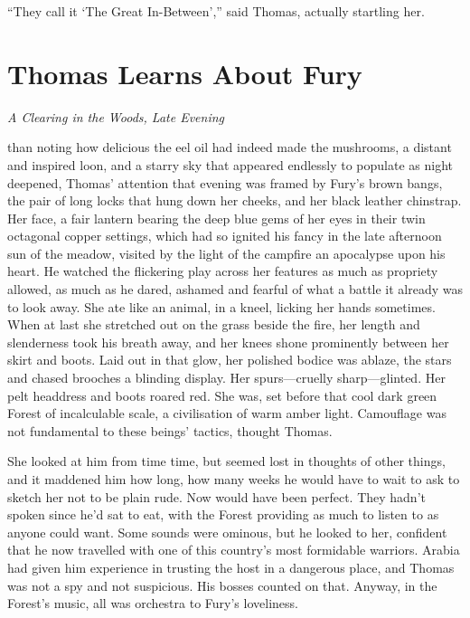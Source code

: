 \documentclass[11pt,a5paper]{article}
\newcommand{\alet}[1]{\textit{#1}\vspace{1em}}
\begin{document}
``They call it `The Great In-Between','' said Thomas, actually startling her.

\newpage

\section{Thomas Learns About Fury}

\alet{A Clearing in the Woods, Late Evening}

 than noting how delicious the eel oil had indeed made the mushrooms, a distant and inspired loon, and a starry sky that appeared endlessly to populate as night deepened, Thomas' attention that evening was framed by Fury's brown bangs, the pair of long locks that hung down her cheeks, and her black leather chinstrap. Her face, a fair lantern bearing the deep blue gems of her eyes in their twin octagonal copper settings, which had so ignited his fancy in the late afternoon sun of the meadow, visited by the light of the campfire an apocalypse upon his heart. He watched the flickering play across her features as much as propriety allowed, as much as he dared, ashamed and fearful of what a battle it already was to look away. She ate like an animal, in a kneel, licking her hands sometimes. When at last she stretched out on the grass beside the fire, her length and slenderness took his breath away, and her knees shone prominently between her skirt and boots. Laid out in that glow, her polished bodice was ablaze, the stars and chased brooches a blinding display. Her spurs---cruelly sharp---glinted. Her pelt headdress and boots roared red. She was, set before that cool dark green Forest of incalculable scale, a civilisation of warm amber light. Camouflage was not fundamental to these beings' tactics, thought Thomas.

She looked at him from time time, but seemed lost in thoughts of other things, and it maddened him how long, how many weeks he would have to wait to ask to sketch her not to be plain rude. Now would have been perfect. They hadn't spoken since he'd sat to eat, with the Forest providing as much to listen to as anyone could want. Some sounds were ominous, but he looked to her, confident that he now travelled with one of this country's most formidable warriors. Arabia had given him experience in trusting the host in a dangerous place, and Thomas was not a spy and not suspicious. His bosses counted on that. Anyway, in the Forest's music, all was orchestra to Fury's loveliness.
\end{document}
